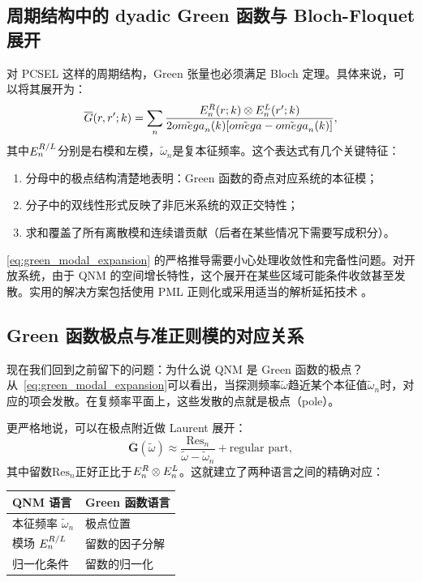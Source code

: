 \subsection{周期结构中的 dyadic Green 函数与 Bloch-Floquet 展开}
对 PCSEL 这样的周期结构，Green 张量也必须满足 Bloch 定理。具体来说，可以将其展开为：
\begin{equation}
\overline{G}(r,r';k) = \sum_n \frac{E_n^{R}(r;k)\otimes E_n^{L}(r';k)}{2\tilde{omega}_n(k)[\tilde{omega}-\tilde{omega}_n(k)]},
\label{eq:green_modal_expansion}
\end{equation}
其中$E_n^{R/L}$分别是右模和左模，$\tilde{\omega}_n$是复本征频率。这个表达式有几个关键特征：
\begin{enumerate}
  \item 分母中的极点结构清楚地表明：Green 函数的奇点对应系统的本征模；
  \item 分子中的双线性形式反映了非厄米系统的双正交特性；
  \item 求和覆盖了所有离散模和连续谱贡献（后者在某些情况下需要写成积分）。
\end{enumerate}

\cref{eq:green_modal_expansion} 的严格推导需要小心处理收敛性和完备性问题。对开放系统，由于 QNM 的空间增长特性，这个展开在某些区域可能条件收敛甚至发散。实用的解决方案包括使用 PML 正则化或采用适当的解析延拓技术 \cite{sauvan2013qnm,kristensen2015qnm}。

\subsection{Green 函数极点与准正则模的对应关系}
现在我们回到之前留下的问题：为什么说 QNM 是 Green 函数的极点？从~\cref{eq:green_modal_expansion}可以看出，当探测频率$\tilde{\omega}$趋近某个本征值$\tilde{\omega}_n$时，对应的项会发散。在复频率平面上，这些发散的点就是极点（pole）。

更严格地说，可以在极点附近做 Laurent 展开：
\begin{equation}
\overline{\bm{G}}(\tilde{\omega}) \approx \frac{\text{Res}_n}{\tilde{\omega}-\tilde{\omega}_n} + \text{regular part},
\label{eq:green_laurent_expansion}
\end{equation}
其中留数$\text{Res}_n$正好正比于$E_n^{R}\otimes E_n^{L}$。这就建立了两种语言之间的精确对应：
\begin{center}
\begin{tabular}{ll}
\hline
QNM 语言 & Green 函数语言 \\
\hline
本征频率 $\tilde{\omega}_n$ & 极点位置 \\
模场 $E_n^{R/L}$ & 留数的因子分解 \\
归一化条件 & 留数的归一化 \\
\hline
\end{tabular}
\end{center}

